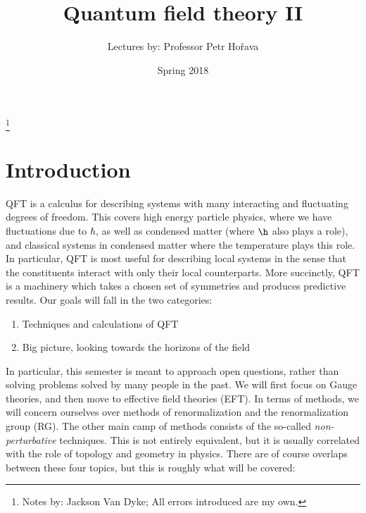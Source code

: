 \documentclass{booc}
\begin{document}
\title{Quantum field theory II}
\author{Lectures by: Professor Petr Ho\v{r}ava}
\thanks{Notes by: Jackson Van Dyke; All errors introduced are my own.}
\date{Spring 2018}

\maketitle
\tableofcontents
\pagebreak
\section{Introduction}

QFT is a calculus for describing systems with many interacting and fluctuating
degrees of freedom.
This covers high energy particle physics, 
where we have fluctuations due to $\hbar$, as well as
condensed matter (where $\h$ also plays a role), and classical systems
in condensed matter where the temperature plays this role.
In particular, QFT is most useful for describing local systems
in the sense that the constituents interact with only their local counterparts.
More succinctly, QFT is a machinery which takes a chosen set of symmetries 
and produces predictive results.
Our goals will fall in the two categories:
\begin{enumerate}
\item Techniques and calculations of QFT
\item Big picture, looking towards the horizons of the field
\end{enumerate}
In particular, this semester is meant to approach open questions, rather than solving
problems solved by many people in the past.
We will first focus on Gauge theories, and then move to
effective field theories (EFT). 
In terms of methods, we will concern ourselves over methods of renormalization
and the renormalization group (RG).
The other main camp of methods consists of the so-called \emph{non-perturbative}
techniques.
This is not entirely equivalent, but it is usually correlated with 
the role of topology and geometry in physics.
There are of course overlaps between these four topics, but this is roughly what will be covered:
\end{document}

